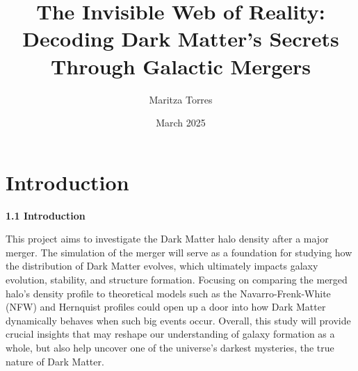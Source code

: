 \documentclass[linenumbers]{aastex631}
\begin{document}
\makeatletter
\let\frontmatter@title@above=\relax
\makeatother
\renewcommand{\subsection}[1]{%
  \noindent\textbf{\large #1}\par
}
\renewcommand{\subsubsection}[1]{%
  \hspace{1em}\textbf{\normalsize #1}\par}

\newcommand{\vdag}{(v)^\dagger}
\newcommand\aastex{AAS\TeX}
\newcommand\latex{La\TeX}

\title{The Invisible Web of Reality: Decoding Dark Matter's Secrets Through Galactic Mergers }
\author{Maritza Torres}
\date{March 2025}
\section{Introduction}
\subsection{1.1 Introduction}
\subsubsection{}
This project aims to investigate the Dark Matter halo density after a major merger. The simulation of the merger will serve as a foundation for studying how the distribution of Dark Matter evolves, which ultimately impacts galaxy evolution, stability, and structure formation.  Focusing on comparing the merged halo’s density profile to theoretical models such as the Navarro-Frenk-White (NFW) and Hernquist profiles could open up a door into how Dark Matter dynamically behaves when such big events occur.  Overall, this study will provide crucial insights that may reshape our understanding of galaxy formation as a whole, but also help uncover one of the universe's darkest mysteries, the true nature of Dark Matter.  
\end{document}
